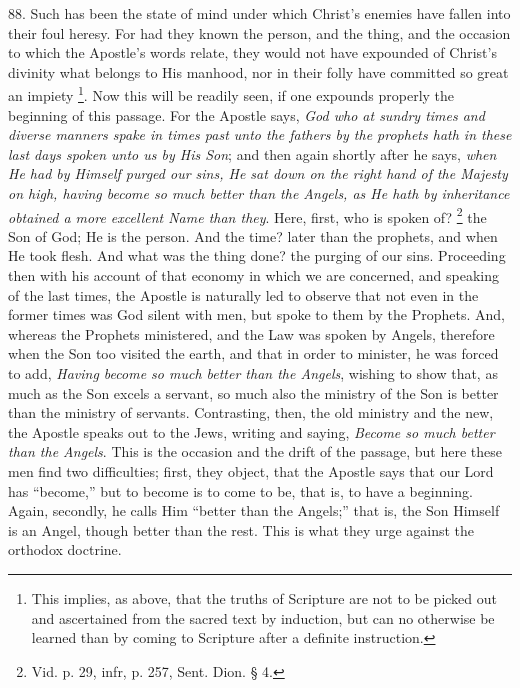 88. Such has been the state of
mind under which Christ's enemies have fallen into their foul heresy.
For had they known the person, and the thing, and the occasion to
which the Apostle's words relate, they would not have expounded of
Christ's divinity what belongs to His manhood, nor in their folly have
committed so great an impiety \footnote{This implies, as above, that the truths of Scripture are not to be
picked out and ascertained from the sacred text by induction, but can
no otherwise be learned than by coming to Scripture after a definite
instruction.}. Now this will be readily seen, if one expounds properly the
beginning of this passage. For the Apostle says, \emph{God who at sundry
times and diverse manners spake in times past unto the fathers by the
prophets hath in these last days spoken unto us by His Son}; and
then again shortly after he says, \emph{when He had by Himself purged our
sins, He sat down on the right hand of the Majesty on high, having
become so much better than the Angels, as He hath by inheritance
obtained a more excellent Name than they}. Here, first, who is
spoken of? \footnote{Vid. p. 29, infr, p. 257, Sent. Dion. § 4.} the Son of
God; He is the person. And the time? later than the prophets, and when
He took flesh. And what was the thing done? the purging of our sins.
Proceeding then with his account of that economy in which we are
concerned, and speaking of the last times, the Apostle is naturally
led to observe that not even in the former times was God silent with
men, but spoke to them by the Prophets. And, whereas the Prophets
ministered, and the Law was spoken by Angels, therefore when the Son
too visited the earth, and that in order to minister, he was forced to
add, \emph{Having become so much better than the Angels}, wishing to
show that, as much as the Son excels a servant, so much also the
ministry of the Son is better than the ministry of servants.
Contrasting, then, the old ministry and the new, the Apostle speaks
out to the Jews, writing and saying, \emph{Become so much better than the
Angels}. This is the occasion and the drift of the passage,
but here these men find two difficulties; first, they object, that the
Apostle says that our Lord has ``become,'' but to become is to come to
be, that is, to have a beginning. Again, secondly, he calls Him ``better
than the Angels;'' that is, the Son Himself is an Angel, though
better than the rest. This is what they urge against the orthodox
doctrine.

